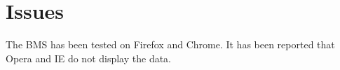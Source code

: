 




\section*{Issues}

The B\+MS has been tested on Firefox and Chrome. It has been reported that Opera and IE do not display the data. 